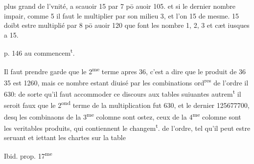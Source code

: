 \documentclass[11pt,a4paper]{article}
\begin{document}

plus grand de l'vnité, a scauoir 15 par 7 pō auoir 105. et si le dernier nombre  impair, comme 5 il faut le multiplier par son milieu 3, et l'on 15 de mesme. 15 doibt estre multiplié par 8 pō auoir 120 que font les nombre 1, 2, 3 et cæt iusques a 15.

p. 146 au commencem\textsuperscript{t}.

Il faut prendre garde que le 2\textsuperscript{me} terme apres 36, c'est a dire que le produit de 36  35 est 1260, mais ce nombre estant diuisé par les combinations ord\textsuperscript{res} de l'ordre il \ill{} 630: de sorte qu'il faut accommoder ce discours aux tables suiuantes autrem\textsuperscript{t} il seroit faux que le 2\textsuperscript{ond} terme de la multiplication fut 630, et le dernier 125677700, desq\ill{} les combinaons de la 3\textsuperscript{me} colomne sont ostez, ceux de la 4\textsuperscript{me} colomne sont les veritables produits, qui contiennent le changem\textsuperscript{t}. de l'ordre, tel qu'il peut estre seruant et iettant les chartes sur la table

Ibid. prop. 17\textsuperscript{me}
\end{document}
